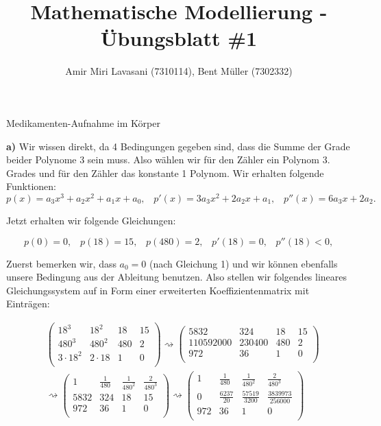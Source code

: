 \documentclass[a4paper]{article}
\newenvironment{Aufgabe}[2][Aufgabe]{\begin{trivlist}
\item[\hskip \labelsep {\bfseries #1}\hskip \labelsep {\bfseries #2.}]}{\end{trivlist}}
\begin{document}
 
\title{ \textbf{Mathematische Modellierung - Übungsblatt \#1} }

\author{Amir Miri Lavasani (7310114), Bent Müller (7302332)} \maketitle

\begin{Aufgabe}{1}
Medikamenten-Aufnahme im Körper
\end{Aufgabe}

\textbf{a)} Wir wissen direkt, da 4 Bedingungen gegeben sind, dass die Summe der Grade beider Polynome 3 
sein muss. Also wählen wir für den Zähler ein Polynom 3. Grades und für den
Zähler das konstante 1 Polynom. Wir erhalten folgende Funktionen:
\[
	p(x) = a_3 x^{3} + a_2 x ^{2} + a_1 x + a_0 ,\;\;\; 
	p'(x) = 3 a_3 x ^{2} + 2 a_2 x + a_1 ,\;\;\; 
	p''(x) = 6 a_3 x + 2 a_2
.\] 

Jetzt erhalten wir folgende Gleichungen:

\[
	p(0) = 0,\;\;\; 
	p(18) = 15,\;\;\; 
	p(480) = 2,\;\;\; 
	p'(18) = 0,\;\;\; 
	p''(18) < 0,
\] 

Zuerst bemerken wir, dass $a_0 = 0$ (nach Gleichung 1) und wir
können ebenfalls unsere Bedingung aus der Ableitung benutzen. Also
stellen wir folgendes lineares Gleichungssystem auf in Form einer erweiterten Koeffizientenmatrix
mit Einträgen:

\begin{align*}
	& \left(\begin{array}{ccc|c}  
		18 ^3 & 18 ^2 & 18 & 15\\
		480 ^3 & 480 ^2 & 480 & 2\\
		3 \cdot 18 ^2 & 2 \cdot 18 & 1 & 0\\
	\end{array}\right)
	\rightsquigarrow 
	\left(\begin{array}{ccc|c}  
		5832 & 324 & 18 & 15\\
		110592000 & 230400 & 480 & 2\\
		972 & 36 & 1 & 0\\
	\end{array}\right) \\
	&\rightsquigarrow 
	\left(\begin{array}{ccc|c}  
		1 & \frac{ 1 }{ 480 } & \frac{ 1 }{ 480 ^2 } & \frac{ 2 }{ 480 ^3 }\\
		5832 & 324 & 18 & 15\\
		972 & 36 & 1 & 0\\
	\end{array}\right)
	\rightsquigarrow
	\left(\begin{array}{ccc|c}  
		1 & \frac{ 1 }{ 480 } & \frac{ 1 }{ 480 ^2 } & \frac{ 2 }{ 480 ^3 }\\
		0 & \frac{ 6237 }{ 20 } & \frac{ 57519 }{ 3200 } & \frac{ 3839973 }{ 256000 } \\
		972 & 36 & 1 & 0\\
	\end{array}\right)
\end{align*}
\end{document}
